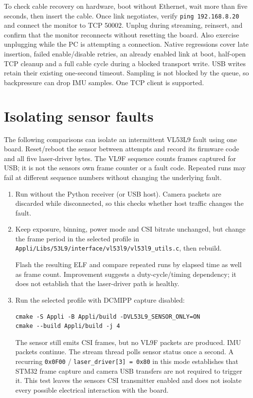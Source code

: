 \documentclass[10pt,a4paper,oneside]{report}
\begin{document}
To check cable recovery on hardware, boot without Ethernet, wait more than five seconds, then insert the cable. Once link negotiates, verify \texttt{ping 192.\allowbreak{}168.\allowbreak{}8.\allowbreak{}20} and connect the monitor to TCP 50002. Unplug during streaming, reinsert, and confirm that the monitor reconnects without resetting the board. Also exercise unplugging while the PC is attempting a connection. Native regressions cover late insertion, failed enable/disable retries, an already enabled link at boot, half-open TCP cleanup and a full cable cycle during a blocked transport write. USB writes retain their existing one-second timeout. Sampling is not blocked by the queue, so backpressure can drop IMU samples. One TCP client is supported.

\section{Isolating sensor faults}\label{wiki-tools-streaming-and-diagnostics--isolating-sensor-faults}

The following comparisons can isolate an intermittent VL53L9 fault using one board. Reset/reboot the sensor between attempts and record its firmware code and all five laser-driver bytes. The VL9F sequence counts frames captured for USB; it is not the sensor\textquotesingle s own frame counter or a fault code. Repeated runs may fail at different sequence numbers without changing the underlying fault.

\begin{enumerate}
\def\labelenumi{\arabic{enumi}.}
\item
  Run without the Python receiver (or USB host). Camera packets are discarded while disconnected, so this checks whether host traffic changes the fault.
\item
  Keep exposure, binning, power mode and CSI bitrate unchanged, but change the frame period in the selected profile in \texttt{Appli/\allowbreak{}Libs/\allowbreak{}53L9/\allowbreak{}interface/\allowbreak{}vl53l9/\allowbreak{}vl53l9\_\allowbreak{}utils.\allowbreak{}c}, then rebuild.

  Flash the resulting ELF and compare repeated runs by elapsed time as well as frame count. Improvement suggests a duty-cycle/timing dependency; it does not establish that the laser-driver path is healthy.
\item
  Run the selected profile with DCMIPP capture disabled:

\begin{verbatim}
cmake -S Appli -B Appli/build -DVL53L9_SENSOR_ONLY=ON
cmake --build Appli/build -j 4
\end{verbatim}

  The sensor still emits CSI frames, but no VL9F packets are produced. IMU packets continue. The stream thread polls sensor status once a second. A recurring \texttt{0x0F00} / \texttt{laser\_\allowbreak{}driver[3] = 0x80} in this mode establishes that STM32 frame capture and camera USB transfers are not required to trigger it. This test leaves the sensor\textquotesingle s CSI transmitter enabled and does not isolate every possible electrical interaction with the board.
\end{enumerate}
\end{document}

